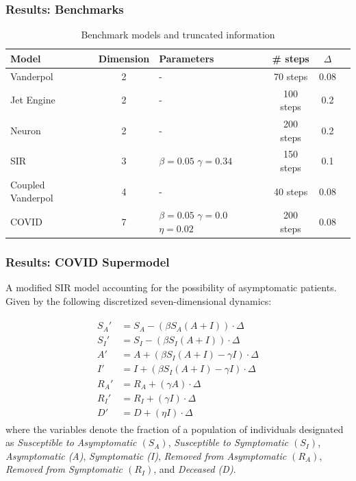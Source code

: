 \documentclass{beamer}
\begin{document}
\begin{frame}
  \frametitle{\textbf{Results:}  Benchmarks}
  \begin{table}[h!]\scriptsize
    \centering
  \begin{tabular}{|p{1.5cm}|c|p{1.7cm}|c|c|p{5cm}|}
  \hline
  Model & Dimension & Parameters & \# steps & $\Delta$  \\
  \hline
  Vanderpol & 2 & \quad \quad \; - & 70 steps & 0.08 \\
  \hline
  Jet Engine& 2 & \quad \quad \; - & 100 steps & 0.2  \\
  \hline
  Neuron & 2 & \quad \quad \; - & 200 steps & 0.2 \\
  \hline
  SIR& 3 & $\beta=0.05$ \newline $\gamma=0.34$ & 150 steps & 0.1 \\
  \hline
  Coupled \newline Vanderpol & 4 & \quad \quad \; - & 40 steps & 0.08 \\
  \hline
  COVID & 7 & $\beta=0.05$ \newline $\gamma=0.0$ \newline $\eta=0.02$ & 200 steps & 0.08 \\
  \hline
  \end{tabular}
  \label{tab:modeldyns}
  \caption{Benchmark models and truncated information}
  \end{table}
\end{frame}

\begin{frame} \small
  \frametitle{\textbf{Results:}  COVID Supermodel}
A modified SIR model accounting for the possibility of asymptomatic patients. Given by the following discretized seven-dimensional dynamics:

\begin{align*}
  \begin{split}
   S_A' & = S_A  -(\beta S_A(A+I))\cdot \Delta \\
   S_I' & = S_I  -(\beta S_I (A + I))\cdot \Delta \\
   A' & = A + (\beta S_I(A+I) - \gamma I)\cdot \Delta \\
   I' & = I + (\beta S_I (A+I) - \gamma I)\cdot  \Delta \\
   R_A' & = R_A + (\gamma A)\cdot \Delta \\
   R_I' & = R_I + (\gamma I)\cdot \Delta \\
   D' & = D + (\eta I)\cdot \Delta
 \end{split}
\end{align*}
where the variables denote the fraction of a population of individuals designated as \emph{Susceptible to Asymptomatic $(S_A)$}, \emph{Susceptible to Symptomatic $(S_I)$}, \emph{Asymptomatic (A)}, \emph{Symptomatic (I)}, \emph{Removed from Asymptomatic $(R_A)$}, \emph{Removed from Symptomatic $(R_I)$}, and \emph{Deceased (D)}.
\end{frame}
\end{document}
